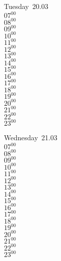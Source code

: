 \documentclass[11pt, a4paper]{book}\usepackage[]{graphicx}\usepackage[]{color}
\begin{document}
\begin{weekdaybox}
  Tuesday~20.03\\
  { 
  \vfill
  $07^{00}$\\
$08^{00}$\\
$09^{00}$\\
$10^{00}$\\
$11^{00}$\\
$12^{00}$\\
$13^{00}$\\
$14^{00}$\\
$15^{00}$\\
$16^{00}$\\
$17^{00}$\\
$18^{00}$\\
$19^{00}$\\
$20^{00}$\\
$21^{00}$\\
$22^{00}$\\
$23^{00}$\\
  }
\end{weekdaybox}
\begin{weekdaybox}
  Wednesday~21.03\\
  { 
  \vfill
  $07^{00}$\\
$08^{00}$\\
$09^{00}$\\
$10^{00}$\\
$11^{00}$\\
$12^{00}$\\
$13^{00}$\\
$14^{00}$\\
$15^{00}$\\
$16^{00}$\\
$17^{00}$\\
$18^{00}$\\
$19^{00}$\\
$20^{00}$\\
$21^{00}$\\
$22^{00}$\\
$23^{00}$\\
  }
\end{weekdaybox}
\clearpage
\begin{headerbox}
\end{headerbox}
\end{document}
